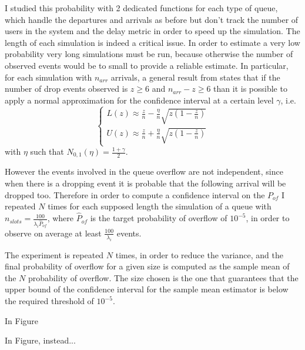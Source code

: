 \documentclass[10pt]{article}
\begin{document}
I studied this probability with 2 dedicated functions for each type of queue, which handle the departures and arrivals as before but don't track the number of users in the system and the delay metric in order to speed up the simulation. The length of each simulation is indeed a critical issue. In order to estimate a very low probability very long simulations must be run, because otherwise the number of observed events would be to small to provide a reliable estimate. In particular, for each simulation with $n_{arr}$ arrivals, a general result from \cite{leb} states that if the number of drop events observed is $z \ge 6$ and $n_{arr} - z \ge 6$ than it is possible to apply a normal approximation for the confidence interval at a certain level $\gamma$, i.e.
\begin{equation}
  \begin{cases}
  L(z) \approx \frac{z}{n} - \frac{\eta}{n}\sqrt{z\left(1 - \frac{z}{n}\right)} \\
  U(z) \approx \frac{z}{n} + \frac{\eta}{n}\sqrt{z\left(1 - \frac{z}{n}\right)}
  \end{cases}
\end{equation}
with $\eta$ such that $N_{0,1}(\eta) = \frac{1+\gamma}{2}$.

However the events involved in the queue overflow are not independent, since when there is a dropping event it is probable that the following arrival will be dropped too. Therefore in order to compute a confidence interval on the $P_{of}$ I repeated $N$ times for each supposed length the simulation of a queue with $n_{slots} = \frac{100}{\lambda_i \hat{P}_{of}}$, where $\hat{P}_{of}$ is the target probability of overflow of $10^{-5}$, in order to observe on average at least $\frac{100}{\lambda_i}$ events. 

The experiment is repeated $N$ times, in order to reduce the variance, and the final probability of overflow for a given size is computed as the sample mean of the $N$ probability of overflow. The size chosen is the one that guarantees that the upper bound of the confidence interval for the sample mean estimator is below the required threshold of $10^{-5}$. 

In Figure 

In Figure, instead... 
\end{document}
